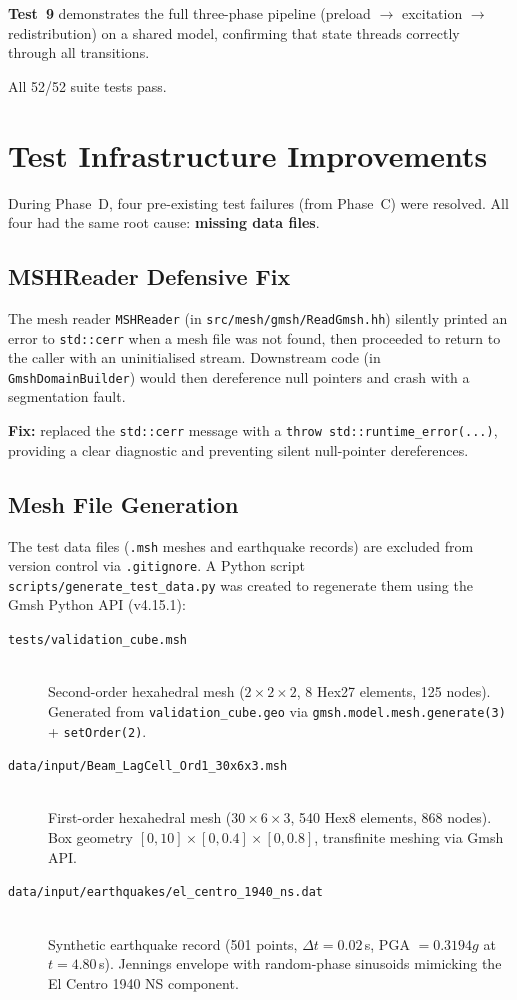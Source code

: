 \textbf{Test~9} demonstrates the full three-phase pipeline
(preload $\to$ excitation $\to$ redistribution) on a shared model,
confirming that state threads correctly through all transitions.

All 52/52 suite tests pass.


\section{Test Infrastructure Improvements}

During Phase~D, four pre-existing test failures (from Phase~C) were
resolved.  All four had the same root cause: \textbf{missing data files}.

\subsection{MSHReader Defensive Fix}

The mesh reader \texttt{MSHReader} (in \texttt{src/mesh/gmsh/ReadGmsh.hh})
silently printed an error to \texttt{std::cerr} when a mesh file was not
found, then proceeded to return to the caller with an uninitialised stream.
Downstream code (in \texttt{GmshDomainBuilder}) would then dereference
null pointers and crash with a segmentation fault.

\textbf{Fix:} replaced the \texttt{std::cerr} message with a
\texttt{throw std::runtime\_error(...)}, providing a clear diagnostic
and preventing silent null-pointer dereferences.

\subsection{Mesh File Generation}

The test data files (\texttt{.msh} meshes and earthquake records) are
excluded from version control via \texttt{.gitignore}.  A Python script
\texttt{scripts/generate\_test\_data.py} was created to regenerate them
using the Gmsh Python API (v4.15.1):

\begin{description}
  \item[\texttt{tests/validation\_cube.msh}] \hfill \\
    Second-order hexahedral mesh ($2 \times 2 \times 2$, 8 Hex27 elements,
    125 nodes).  Generated from \texttt{validation\_cube.geo} via
    \texttt{gmsh.model.mesh.generate(3)} + \texttt{setOrder(2)}.

  \item[\texttt{data/input/Beam\_LagCell\_Ord1\_30x6x3.msh}] \hfill \\
    First-order hexahedral mesh ($30 \times 6 \times 3$, 540 Hex8 elements,
    868 nodes).  Box geometry $[0,10] \times [0,0.4] \times [0,0.8]$,
    transfinite meshing via Gmsh API.

  \item[\texttt{data/input/earthquakes/el\_centro\_1940\_ns.dat}] \hfill \\
    Synthetic earthquake record (501 points, $\Delta t = 0.02$\,s,
    PGA $= 0.3194g$ at $t = 4.80$\,s).  Jennings envelope with random-phase
    sinusoids mimicking the El Centro 1940 NS component.
\end{description}

